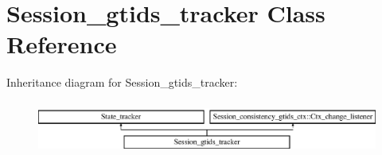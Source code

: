 \hypertarget{classSession__gtids__tracker}{}\section{Session\+\_\+gtids\+\_\+tracker Class Reference}
\label{classSession__gtids__tracker}
Inheritance diagram for Session\+\_\+gtids\+\_\+tracker\+:\begin{figure}[H]
\begin{center}
\leavevmode
\includegraphics[height=1.777778cm]{classSession__gtids__tracker}
\end{center}
\end{figure}
